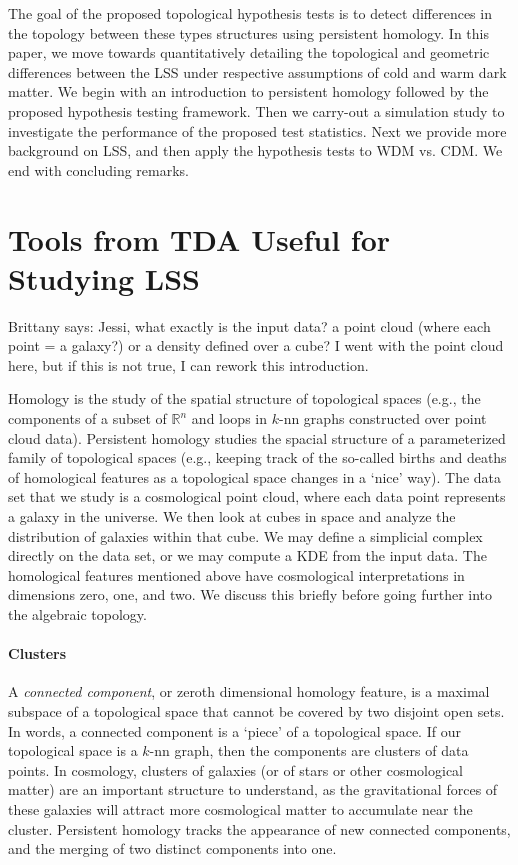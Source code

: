 \documentclass[12pt]{article}
\newcommand{\brittany}[1]{{\color{cyan} Brittany says: #1}}
\begin{document}
The goal of the proposed topological hypothesis tests is to detect differences in the topology between these types structures using persistent homology.  In this paper, we move towards quantitatively detailing the topological and geometric differences between the LSS under respective assumptions of cold and warm dark matter.  We begin with an introduction to persistent homology followed by the proposed hypothesis testing framework.  Then we carry-out a simulation study to investigate the performance of the proposed test statistics.  Next we provide more background on LSS, and then apply the hypothesis tests to {\color{red} WDM vs. CDM}.  We end with concluding remarks.



\section{Tools from TDA Useful for Studying LSS}
\label{sec:tda}
\brittany{Jessi, what exactly is the input data? a point cloud (where each point
    = a galaxy?) or a density
defined over a cube? I went with the point cloud here, but if this is not true,
I can rework this introduction.}

Homology is the study of the spatial structure of topological spaces (e.g., the
components of a subset of $\mathbb{R}^n$ and loops in $k$-nn graphs constructed
over point cloud data).  Persistent homology studies the spacial structure of a
parameterized family of topological spaces (e.g., keeping track of the so-called
births and deaths of homological features as a topological space changes in a
`nice' way).
%
The data set that we study is a cosmological point cloud, where each data point
represents a galaxy in the universe.  We then look at cubes in space and analyze
the distribution of galaxies within that cube. We may define a simplicial
complex directly on the data set, or we may compute a KDE from the input data.
The homological features mentioned above have cosmological interpretations in
dimensions zero, one, and two.  We discuss this briefly before going further
into the algebraic topology.

\paragraph{Clusters} 
A \emph{connected
component}, or zeroth dimensional homology feature, is a maximal subspace of a topological
space that cannot be covered by two disjoint open sets. In words, a connected
component is a `piece' of a topological space.  If our topological space is a
$k$-nn graph, then the components are clusters of data points.  In cosmology,
clusters of galaxies (or of stars or other cosmological matter) are an important
structure to understand, as the gravitational forces of these galaxies will
attract more cosmological matter to accumulate near the cluster.  Persistent
homology tracks the appearance of new connected components, and the merging of
two distinct components into one.
\end{document}
